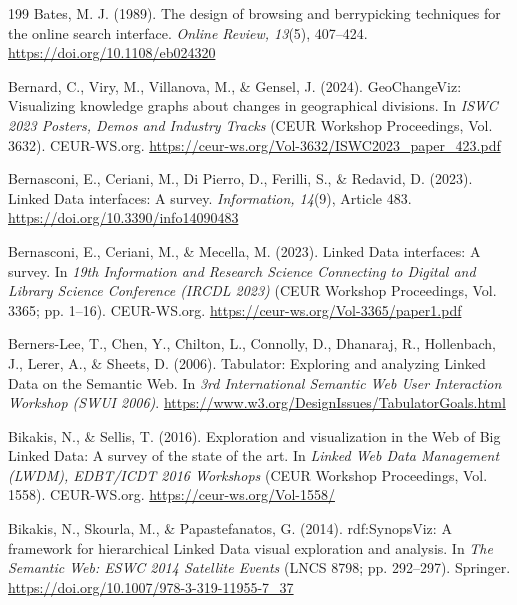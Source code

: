 \documentclass[manuscript,review,screen]{acmart}
\begin{document}
\begin{thebibliography}{199}
\setlength{\bibhang}{1.5em}
\setlength{\bibsep}{0.45em}
 Bates, M. J. (1989). The design of browsing and berrypicking techniques for the online search interface. \textit{Online Review, 13}(5), 407--424. \url{https://doi.org/10.1108/eb024320}

 Bernard, C., Viry, M., Villanova, M., \& Gensel, J. (2024). GeoChangeViz: Visualizing knowledge graphs about changes in geographical divisions. In \textit{ISWC 2023 Posters, Demos and Industry Tracks} (CEUR Workshop Proceedings, Vol. 3632). CEUR-WS.org. \url{https://ceur-ws.org/Vol-3632/ISWC2023_paper_423.pdf}

 Bernasconi, E., Ceriani, M., Di Pierro, D., Ferilli, S., \& Redavid, D. (2023). Linked Data interfaces: A survey. \textit{Information, 14}(9), Article 483. \url{https://doi.org/10.3390/info14090483}

 Bernasconi, E., Ceriani, M., \& Mecella, M. (2023). Linked Data interfaces: A survey. In \textit{19th Information and Research Science Connecting to Digital and Library Science Conference (IRCDL 2023)} (CEUR Workshop Proceedings, Vol. 3365; pp. 1--16). CEUR-WS.org. \url{https://ceur-ws.org/Vol-3365/paper1.pdf}

 Berners-Lee, T., Chen, Y., Chilton, L., Connolly, D., Dhanaraj, R., Hollenbach, J., Lerer, A., \& Sheets, D. (2006). Tabulator: Exploring and analyzing Linked Data on the Semantic Web. In \textit{3rd International Semantic Web User Interaction Workshop (SWUI 2006)}. \url{https://www.w3.org/DesignIssues/TabulatorGoals.html}

 Bikakis, N., \& Sellis, T. (2016). Exploration and visualization in the Web of Big Linked Data: A survey of the state of the art. In \textit{Linked Web Data Management (LWDM), EDBT/ICDT 2016 Workshops} (CEUR Workshop Proceedings, Vol. 1558). CEUR-WS.org. \url{https://ceur-ws.org/Vol-1558/}

 Bikakis, N., Skourla, M., \& Papastefanatos, G. (2014). rdf:SynopsViz: A framework for hierarchical Linked Data visual exploration and analysis. In \textit{The Semantic Web: ESWC 2014 Satellite Events} (LNCS 8798; pp. 292--297). Springer. \url{https://doi.org/10.1007/978-3-319-11955-7_37}


\end{thebibliography}
\end{document}
